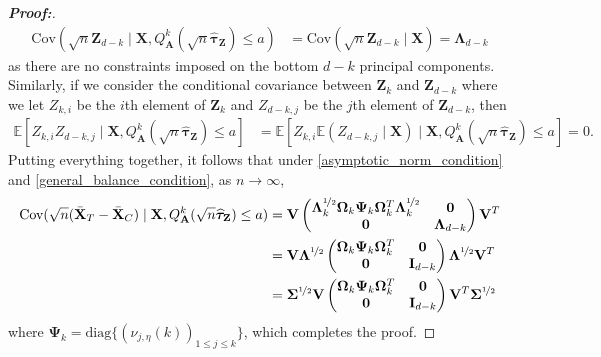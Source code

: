 \documentclass[11pt,twoside]{article}
\theoremstyle{definition}
\theoremstyle{remark}
\begin{document}
\begin{proof}[\textbf{Proof:}]
\begin{align*}
    \text{Cov}(\sqrt{n}\mathbf{Z}_{d-k} \mid \mathbf{X}, Q^k_\mathbf{A}(\sqrt{n}\widehat{\bm{\tau}}_{\mathbf{Z}}) \leq a) &= \text{Cov}(\sqrt{n}\mathbf{Z}_{d-k} \mid \mathbf{X}) = \mathbf{\Lambda}_{d-k}
\end{align*}
as there are no constraints imposed on the bottom $d - k$ principal components. Similarly, if we consider the conditional covariance between $\mathbf{Z}_k$ and $\mathbf{Z}_{d - k}$ where we let $Z_{k, i}$ be the $i$th element of $\mathbf{Z}_k$ and $Z_{d-k, j}$ be the $j$th element of $\mathbf{Z}_{d - k}$, then
\begin{align*}
    \mathbb{E}\left[Z_{k, i} Z_{d-k, j} \mid \mathbf{X},  Q^k_{\mathbf{A}}(\sqrt{n}\widehat{\bm{\tau}}_{\mathbf{Z}}) \leq a \right] &= \mathbb{E}\left[Z_{k, i} \mathbb{E}\left( Z_{d-k, j} \mid \mathbf{X} \right) \mid  \mathbf{X}, Q^k_{\mathbf{A}}( \sqrt{n}\widehat{\bm{\tau}}_{\mathbf{Z}}) \leq a \right] = 0.
\end{align*}
Putting everything together, it follows that under \cref{asymptotic_norm_condition} and \cref{general_balance_condition}, as $n \to \infty$,
\begin{align*}
    \text{Cov}(\sqrt{n}(\bar{\mathbf{X}}_T - \bar{\mathbf{X}}_C) \mid \mathbf{X}, Q^k_\mathbf{A}(\sqrt{n} \widehat{\bm{\tau}}_{\mathbf{Z}}) \leq a) &= \mathbf{V}\begin{pmatrix}
        \mathbf{\Lambda}^{\nicefrac{1}{2}}_k \mathbf{\Omega}_k \mathbf{\Psi}_k \mathbf{\Omega}^T_k \mathbf{\Lambda}^{\nicefrac{1}{2}}_k  & \mathbf{0} \\
        \mathbf{0} & \mathbf{\Lambda}_{d-k}
    \end{pmatrix} \mathbf{V}^T \\
     &= \mathbf{V} \mathbf{\Lambda}^{\nicefrac{1}{2}}  \begin{pmatrix}
        \mathbf{\Omega}_k \mathbf{\Psi}_k \mathbf{\Omega}^T_k   & \mathbf{0} \\
        \mathbf{0} & \mathbf{I}_{d-k}
    \end{pmatrix} \mathbf{\Lambda}^{\nicefrac{1}{2}} \mathbf{V}^T \\
    &= \mathbf{\Sigma}^{\nicefrac{1}{2}} \mathbf{V}  \begin{pmatrix}
        \mathbf{\Omega}_k \mathbf{\Psi}_k \mathbf{\Omega}^T_k   & \mathbf{0} \\
        \mathbf{0} & \mathbf{I}_{d-k}
    \end{pmatrix} \mathbf{V}^T  \mathbf{\Sigma}^{\nicefrac{1}{2}} 
\end{align*}
where $\mathbf{\Psi}_k = \text{diag}\{(\nu_{j, \eta}(k))_{1 \leq j \leq k} \}$, which completes the proof.
\end{proof}
\end{document}
